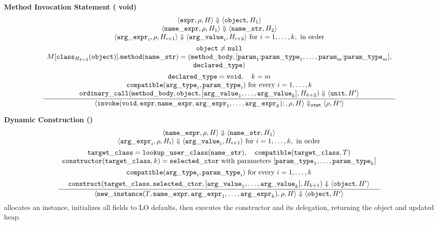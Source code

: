 \textbf{Method Invocation Statement ( void)}
\[
\dfrac{\begin{array}{c}
  \langle \mathtt{expr}, \rho, H\rangle \Downarrow \langle \mathtt{object}, H_1\rangle \\
  \langle \mathtt{name\_expr}, \rho, H_1\rangle \Downarrow \langle \mathtt{name\_str}, H_2\rangle \\
  \langle \mathtt{arg\_expr}_i, \rho, H_{i+1}\rangle \Downarrow \langle \mathtt{arg\_value}_i, H_{i+2}\rangle
    \text{ for } i = 1, \ldots, k, \text{ in order} \\[1ex]
  \mathtt{object} \neq \mathtt{null} \\
  M[\mathtt{class}_{H_{k+2}}(\mathtt{object})].\mathtt{method}(\mathtt{name\_str}) =
    (\mathtt{method\_body}, [\mathtt{param}_1{:}\mathtt{param\_type}_1, \ldots, \mathtt{param}_m{:}\mathtt{param\_type}_m], \\
    \mathtt{declared\_type}) \\[1ex]
  \mathtt{declared\_type} = \mathtt{void}, \quad k = m \\
  \mathtt{compatible}(\mathtt{arg\_type}_i, \mathtt{param\_type}_i) \text{ for every } i = 1, \ldots, k \\
  \mathtt{ordinary\_call}(\mathtt{method\_body}, \mathtt{object}, [\mathtt{arg\_value}_1, \ldots, \mathtt{arg\_value}_k], H_{k+2})
    \Downarrow \langle \mathtt{unit}, H'\rangle
\end{array}}{
  \langle \mathtt{invoke}(\mathtt{void}, \mathtt{expr}, \mathtt{name\_expr}, \mathtt{arg\_expr}_1, \ldots, \mathtt{arg\_expr}_k);, \rho, H\rangle
  \Downarrow_{\mathtt{stmt}} \langle \rho, H'\rangle
}
\]

\textbf{Dynamic Construction ()}
\[
\dfrac{\begin{array}{c}
  \langle \mathtt{name\_expr}, \rho, H\rangle \Downarrow \langle \mathtt{name\_str}, H_1\rangle \\
  \langle \mathtt{arg\_expr}_i, \rho, H_i\rangle \Downarrow \langle \mathtt{arg\_value}_i, H_{i+1}\rangle
    \text{ for } i = 1, \ldots, k, \text{ in order} \\[1ex]
  \mathtt{target\_class} = \mathtt{lookup\_user\_class}(\mathtt{name\_str}), \quad \mathtt{compatible}(\mathtt{target\_class}, T) \\
  \mathtt{constructor}(\mathtt{target\_class}, k) = \mathtt{selected\_ctor} \text{ with parameters }
    [\mathtt{param\_type}_1, \ldots, \mathtt{param\_type}_k] \\[1ex]
  \mathtt{compatible}(\mathtt{arg\_type}_i, \mathtt{param\_type}_i) \text{ for every } i = 1, \ldots, k \\[1ex]
  \mathtt{construct}(\mathtt{target\_class}, \mathtt{selected\_ctor}, [\mathtt{arg\_value}_1, \ldots, \mathtt{arg\_value}_k], H_{k+1})
    \Downarrow \langle \mathtt{object}, H'\rangle
\end{array}}{
  \langle \mathtt{new\_instance}(T, \mathtt{name\_expr}, \mathtt{arg\_expr}_1, \ldots, \mathtt{arg\_expr}_k), \rho, H\rangle
  \Downarrow \langle \mathtt{object}, H'\rangle
}
\]
{\small *\textbf{}
allocates an instance, initializes all fields to LO defaults, then executes the
constructor and its delegation, returning the object and updated heap.}

